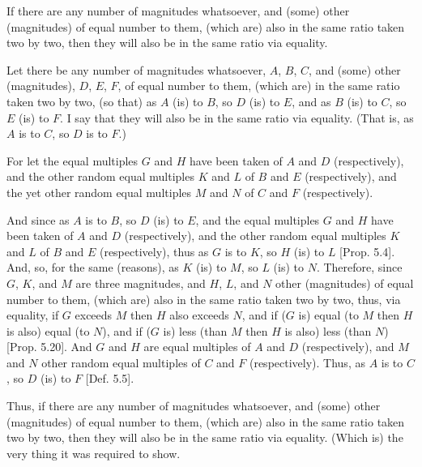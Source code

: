 \begin{Parallel}{}{}
{If there are any number of magnitudes
whatsoever, and (some) other (magnitudes)  of equal  number to them, (which are)
also in the same ratio taken two by two, then they will also be in the
same ratio via equality.

\epsfysize=0.58in
\centerline{}

Let there be any number of magnitudes whatsoever, $A$, $B$,  $C$, and
(some) other (magnitudes), $D$, $E$, $F$, of equal number to them, (which are)
in the same ratio taken two by two, (so that) as $A$ (is) to $B$, so
$D$ (is) to $E$, and as $B$ (is) to $C$, so $E$ (is) to $F$. I say that they
will also be in the same ratio via equality. (That is, as $A$ is to $C$, so
$D$ is to $F$.)

For let the equal multiples $G$ and $H$ have been taken of $A$ and $D$ (respectively), and the other random equal multiples $K$ and $L$ of $B$ and
$E$ (respectively), and the yet other random equal multiples $M$ and $N$ of
$C$ and $F$ (respectively).

And since as $A$ is to $B$, so $D$ (is) to $E$, and the equal multiples $G$ and $H$
have been taken of $A$ and $D$ (respectively), and the other random
equal multiples $K$ and $L$ of $B$ and $E$ (respectively), thus as $G$ is to $K$,
so $H$ (is) to $L$ [Prop. 5.4]. And, so, for the same
(reasons), as $K$ (is) to $M$, so $L$ (is) to $N$. Therefore, since $G$, $K$, and $M$ are three magnitudes, and $H$, $L$, and $N$ other (magnitudes) of equal number to them,
(which are) also in the same ratio taken two by two, thus, via equality,
if $G$ exceeds $M$ then $H$ also exceeds $N$, and if ($G$ is) equal (to $M$ then $H$
is also) equal (to $N$), and if ($G$ is) less (than $M$ then $H$
is also) less (than $N$) [Prop. 5.20].
And  $G$ and $H$ are equal multiples of $A$ and $D$ (respectively),
and $M$ and $N$ other random equal multiples of $C$ and $F$ (respectively).
Thus, as $A$ is to $C$, so $D$ (is) to $F$ [Def. 5.5].

Thus, if there are any number of magnitudes
whatsoever, and (some) other (magnitudes) of equal number to them, (which are)
also in the same ratio taken two by two, then they will also be in the
same ratio via equality. (Which is) the very thing
it was required to show.}
\end{Parallel}


\vspace{7pt}{\footnotesize \noindent $^\dag$ In modern notation, this proposition
reads that if $\alpha:\beta::\epsilon:\zeta$ and $\beta:\gamma::\zeta:\eta$ 
and $\gamma:\delta::\eta:\theta$ 
then $\alpha:\delta::\epsilon:\theta$.}

